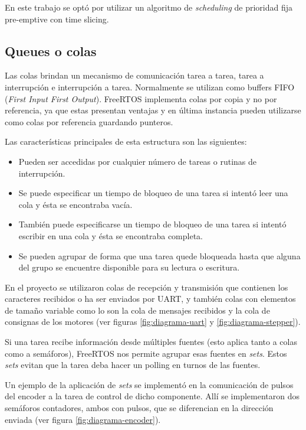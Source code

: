\documentclass{IEEEtran}
\begin{document}
En este trabajo se optó por utilizar un algoritmo de \textit{scheduling} de prioridad fija pre-emptive con time slicing.

\subsection{Queues o colas}
Las colas brindan un mecanismo de comunicación tarea a tarea, tarea a interrupción e interrupción a tarea. Normalmente se utilizan como buffers FIFO (\textit{First Input First Output}). FreeRTOS implementa colas por copia y no por referencia, ya que estas presentan ventajas y en última instancia pueden utilizarse como colas por referencia guardando punteros.

Las características principales de esta estructura son las siguientes:

\begin{itemize}
    \item Pueden ser accedidas por cualquier número de tareas o rutinas de interrupción.
    \item Se puede especificar un tiempo de bloqueo de una tarea si intentó leer una cola y ésta se encontraba vacía.
    \item También puede especificarse un tiempo de bloqueo de una tarea si intentó escribir en una cola y ésta se encontraba completa.
    \item Se pueden agrupar de forma que una tarea quede bloqueada hasta que alguna del grupo se encuentre disponible para su lectura o escritura.
\end{itemize}

En el proyecto se utilizaron colas de recepción y transmisión que contienen los caracteres recibidos o ha ser enviados por UART, y también colas con elementos de tamaño variable como lo son la cola de mensajes recibidos y la cola de consignas de los motores (ver figuras \ref{fig:diagrama-uart} y \ref{fig:diagrama-stepper}).

Si una tarea recibe información desde múltiples fuentes (esto aplica tanto a colas como a semáforos), FreeRTOS nos permite agrupar esas fuentes en \textit{sets}. Estos \textit{sets} evitan que la tarea deba hacer un polling en turnos de las fuentes.

Un ejemplo de la aplicación de \textit{sets} se implementó en la comunicación de pulsos del encoder a la tarea de control de dicho componente. Allí se implementaron dos semáforos contadores, ambos con pulsos, que se diferencian en la dirección enviada (ver figura \ref{fig:diagrama-encoder}).
\end{document}
